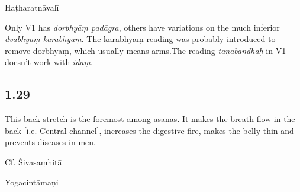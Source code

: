 \begin{ekdosis}
\begin{testimonia}[hp01_028]
Haṭharatnāvalī

\begin{versinnote}
\end{versinnote}

\end{testimonia}

\begin{philcomm}[hp01_028]
Only V1 has \emph{dorbhyāṃ padāgra}, others have variations on the much inferior \emph{dvābhyāṃ karābhyāṃ}. The karābhyaṃ reading was probably introduced to remove dorbhyāṃ, which usually means arms.The reading \emph{tāṇabandhaḥ} in V1 doesn’t work with \emph{idaṃ}.
\end{philcomm}

\subsection*{1.29}
\begin{translation}[hp01_029]
This back-stretch is the foremost among āsanas. It makes the breath flow in the back [i.e. Central channel], increases the digestive fire, makes the belly thin and prevents diseases in men.
\end{translation}

\begin{sources}[hp01_029]
Cf. Śivasaṃhitā

\begin{versinnote}
\end{versinnote}

\end{sources}

\begin{testimonia}[hp01_029]
Yogacintāmaṇi

\begin{versinnote}
\end{versinnote}


\end{testimonia}
\end{ekdosis}

